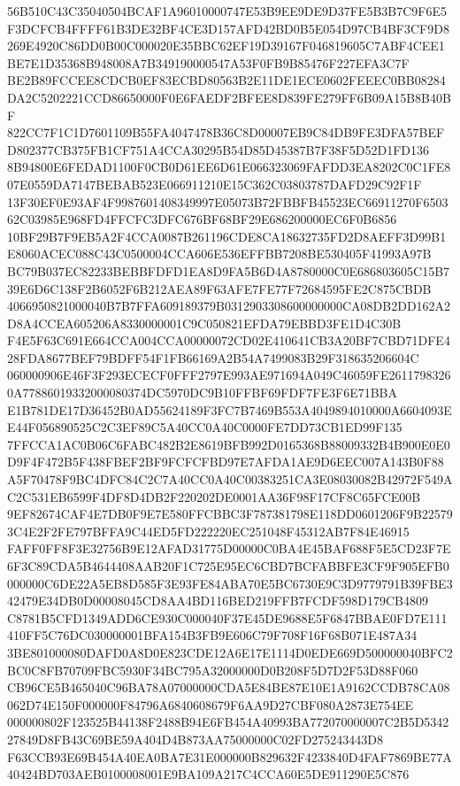 \documentclass[UTF8,fontset=fandol,zihao=-4,a4paper]{ctexart}
\begin{document}
{{56B510C43C35040504BCAF1A96010000747E53B9EE9DE9D37FE5B3B7C9F6E5F3DCFCB4FFFF61B3DE32BF4CE3D157AFD42BD0B5E054D97CB4BF3CF9D8
269E4920C86DD0B00C000020E35BBC62EF19D39167F046819605C7ABF4CEE1BE7E1D35368B948008A7B349190000547A53F0FB9B85476F227EFA3C7F
BE2B89FCCEE8CDCB0EF83ECBD80563B2E11DE1ECE0602FEEEC0BB08284DA2C5202221CCD86650000F0E6FAEDF2BFEE8D839FE279FF6B09A15B8B40BF
822CC7F1C1D7601109B55FA4047478B36C8D00007EB9C84DB9FE3DFA57BEFD802377CB375FB1CF751A4CCA30295B54D85D45387B7F38F5D52D1FD136
8B94800E6FEDAD1100F0CB0D61EE6D61E066323069FAFDD3EA8202C0C1FE807E0559DA7147BEBAB523E066911210E15C362C03803787DAFD29C92F1F
13F30EF0E93AF4F9987601408349997E05073B72FBBFB45523EC66911270F650362C03985E968FD4FFCFC3DFC676BF68BF29E686200000EC6F0B6856
10BF29B7F9EB5A2F4CCA0087B261196CDE8CA18632735FD2D8AEFF3D99B1E8060ACEC088C43C0500004CCA606E536EFFBB7208BE530405F41993A97B
BC79B037EC82233BEBBFDFD1EA8D9FA5B6D4A8780000C0E686803605C15B739E6D6C138F2B6052F6B212AEA89F63AFE7FE77F72684595FE2C875CBDB
4066950821000040B7B7FFA609189379B0312903308600000000CA08DB2DD162A2D8A4CCEA605206A8330000001C9C050821EFDA79EBBD3FE1D4C30B
F4E5F63C691E664CCA004CCA00000072CD02E410641CB3A20BF7CBD71DFE428FDA8677BEF79BDFF54F1FB66169A2B54A7499083B29F318635206604C
060000906E46F3F293ECECF0FFF2797E993AE971694A049C46059FE26117983260A77886019332000080374DC5970DC9B10FFBF69FDF7FE3F6E71BBA
E1B781DE17D36452B0AD55624189F3FC7B7469B553A4049894010000A6604093EE44F056890525C2C3EF89C5A40CC0A40C0000FE7DD73CB1ED99F135
7FFCCA1AC0B06C6FABC482B2E8619BFB992D0165368B88009332B4B900E0E0D9F4F472B5F438FBEF2BF9FCFCFBD97E7AFDA1AE9D6EEC007A143B0F88
A5F70478F9BC4DFC84C2C7A40CC0A40C00383251CA3E08030082B42972F549AC2C531EB6599F4DF8D4DB2F220202DE0001AA36F98F17CF8C65FCE00B
9EF82674CAF4E7DB0F9E7E580FFCBBC3F787381798E118DD0601206F9B225793C4E2F2FE797BFFA9C44ED5FD222220EC251048F45312AB7F84E46915
FAFF0FF8F3E32756B9E12AFAD31775D00000C0BA4E45BAF688F5E5CD23F7E6F3C89CDA5B4644408AAB20F1C725E95EC6CBD7BCFABBFE3CF9F905EFB0
000000C6DE22A5EB8D585F3E93FE84ABA70E5BC6730E9C3D9779791B39FBE342479E34DB0D00008045CD8AA4BD116BED219FFB7FCDF598D179CB4809
C8781B5CFD1349ADD6CE930C000040F37E45DE9688E5F6847BBAE0FD7E111410FF5C76DC030000001BFA154B3FB9E606C79F708F16F68B071E487A34
3BE801000080DAFD0A8D0E823CDE12A6E17E1114D0EDE669D500000040BFC2BC0C8FB70709FBC5930F34BC795A32000000D0B208F5D7D2F53D88F060
CB96CE5B465040C96BA78A07000000CDA5E84BE87E10E1A9162CCDB78CA08062D74E150F000000F84796A6840608679F6AA9D27CBF080A2873E754EE
000000802F123525B44138F2488B94E6FB454A40993BA772070000007C2B5D534227849D8FB43C69BE59A404D4B873AA75000000C02FD275243443D8
F63CCB93E69B454A40EA0BA7E31E000000B829632F4233840D4FAF7869BE77A40424BD703AEB0100008001E9BA109A217C4CCA60E5DE911290E5C876
}}
\end{document}
